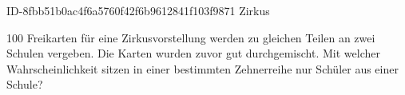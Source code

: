 \begin{exercise}
      {ID-8fbb51b0ac4f6a5760f42f6b9612841f103f9871}
      {Zirkus}
  \ifproblem\problem\par
    100 Freikarten für eine Zirkusvorstellung werden zu gleichen Teilen an zwei
    Schulen vergeben. Die Karten wurden zuvor gut durchgemischt. Mit welcher
    Wahrscheinlichkeit sitzen in einer bestimmten Zehnerreihe nur Schüler
    aus einer Schule?
  \fi
\end{exercise}
